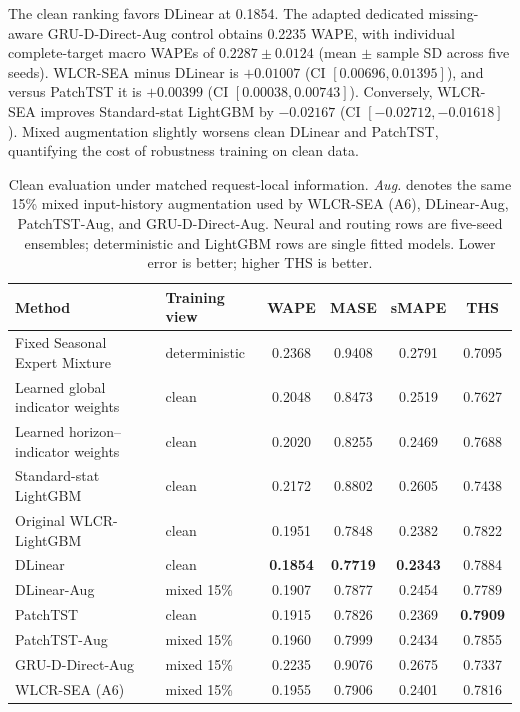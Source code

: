 \documentclass[10pt,conference,letterpaper]{IEEEtran}
\newcommand{\method}{WLCR-SEA}
\newcommand{\originalmethod}{Original WLCR-LightGBM}
\newcommand{\fixedmixture}{Fixed Seasonal Expert Mixture}
\begin{document}
The clean ranking favors DLinear at 0.1854. The adapted dedicated missing-aware GRU-D-Direct-Aug control obtains 0.2235 WAPE, with individual complete-target macro WAPEs of $0.2287\pm0.0124$ (mean $\pm$ sample SD across five seeds). \method{} minus DLinear is $+0.01007$ (CI $[0.00696,0.01395]$), and versus PatchTST it is $+0.00399$ (CI $[0.00038,0.00743]$). Conversely, \method{} improves Standard-stat LightGBM by $-0.02167$ (CI $[-0.02712,-0.01618]$). Mixed augmentation slightly worsens clean DLinear and PatchTST, quantifying the cost of robustness training on clean data.

\begin{table}[t]
\centering
\caption{Clean evaluation under matched request-local information. \emph{Aug.} denotes the same 15\% mixed input-history augmentation used by \method{} (A6), DLinear-Aug, PatchTST-Aug, and GRU-D-Direct-Aug. Neural and routing rows are five-seed ensembles; deterministic and LightGBM rows are single fitted models. Lower error is better; higher THS is better.}
\label{tab:clean}
\footnotesize
\setlength{\tabcolsep}{4.8pt}
\begin{tabular}{>{\raggedright\arraybackslash}p{}lcccc}
\toprule
Method & Training view & WAPE & MASE & sMAPE & THS\\
\midrule
\fixedmixture{} & deterministic & 0.2368 & 0.9408 & 0.2791 & 0.7095\\
Learned global indicator weights & clean & 0.2048 & 0.8473 & 0.2519 & 0.7627\\
Learned horizon--indicator weights & clean & 0.2020 & 0.8255 & 0.2469 & 0.7688\\
Standard-stat LightGBM & clean & 0.2172 & 0.8802 & 0.2605 & 0.7438\\
\originalmethod{} & clean & 0.1951 & 0.7848 & 0.2382 & 0.7822\\
DLinear & clean & \textbf{0.1854} & \textbf{0.7719} & \textbf{0.2343} & 0.7884\\
DLinear-Aug & mixed 15\% & 0.1907 & 0.7877 & 0.2454 & 0.7789\\
PatchTST & clean & 0.1915 & 0.7826 & 0.2369 & \textbf{0.7909}\\
PatchTST-Aug & mixed 15\% & 0.1960 & 0.7999 & 0.2434 & 0.7855\\
GRU-D-Direct-Aug & mixed 15\% & 0.2235 & 0.9076 & 0.2675 & 0.7337\\
\method{} (A6) & mixed 15\% & 0.1955 & 0.7906 & 0.2401 & 0.7816\\
\bottomrule
\end{tabular}
\end{table}
\end{document}
